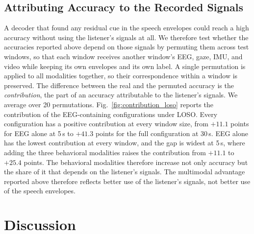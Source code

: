 \documentclass[journal]{IEEEtran}
\begin{document}
\subsection{Attributing Accuracy to the Recorded Signals} \label{ssec:null}

A decoder that found any residual cue in the speech envelopes could reach a high accuracy without using the listener's signals at all. We therefore test whether the accuracies reported above depend on those signals by permuting them across test windows, so that each window receives another window's EEG, gaze, IMU, and video while keeping its own envelopes and its own label. 
A single permutation is applied to all modalities together, so their correspondence within a window is preserved. The difference between the real and the permuted accuracy is the \emph{contribution}, the part of an accuracy attributable to the listener's signals. We average over 20 permutations. Fig.~\ref{fig:contribution_loso} reports the contribution of the EEG-containing configurations under LOSO. Every configuration has a positive contribution at every window size, from $+11.1$ points for EEG alone at 5\,s to $+41.3$ points for the full configuration at 30\,s. EEG alone has the lowest contribution at every window, and the gap is widest at 5\,s, where adding the three behavioral modalities raises the contribution from $+11.1$ to $+25.4$ points. The behavioral modalities therefore increase not only accuracy but the share of it that depends on the listener's signals. The multimodal advantage reported above therefore reflects better use of the listener's signals, not better use of the speech envelopes.


\section{Discussion} \label{discussion}
\end{document}
